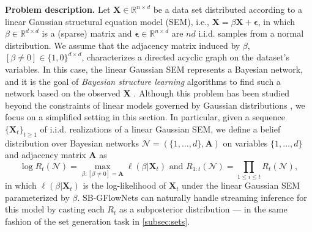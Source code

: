 \documentclass{article}
\newcommand{\pp}[1]{\vspace{0pt}\noindent\textbf{#1}}
\theoremstyle{plain}
\theoremstyle{definition}
\theoremstyle{remark}
\theoremstyle{remark}
\begin{document}
\pp{Problem description.} Let $\mathbf{X} \in \mathbb{R}^{n \times d}$ be a data set distributed according to a linear Gaussian structural equation model (SEM), i.e., $\mathbf{X} = \beta \mathbf{X} + \boldsymbol{\epsilon}$, in which $\beta \in \mathbb{R}^{d \times d}$ is a (sparse) matrix and $\boldsymbol{\epsilon} \in \mathbb{R}^{n \times d}$ are $nd$ i.i.d. samples from a normal distribution. We assume that the adjacency matrix induced by $\beta$, $[\beta \neq 0] \in \{1, 0\}^{d \times d}$, characterizes a directed acyclic graph on the dataset's variables. In this case, the linear Gaussian SEM represents a Bayesian network, and it is the goal of \emph{Bayesian structure learning} algorithms to find such a network based on the observed $\mathbf{X}$ \cite{deleu2022bayesian}. Although this problem has been studied beyond the constraints of linear models governed by Gaussian distributions \cite{deleu2023joint}, we focus on a simplified setting in this section. In particular, given a sequence $\{\mathbf{X}_{t}\}_{t \ge 1}$ of i.i.d. realizations of a linear Gaussian SEM, we define a belief distribution over Bayesian networks $\mathcal{N} = (\{1, \dots, d\}, \mathbf{A})$ on variables $\{1, \dots, d\}$ and adjacency matrix $\mathbf{A}$ as  
\begin{equation}
    \log R_{t}(\mathcal{N}) = \max_{\beta \colon [\beta \neq 0] = \mathbf{A}} \ell \left( \beta | \mathbf{X}_{t} \right) \text{ and } R_{1:t}(\mathcal{N}) = \prod_{1 \le i \le t} R_{t}(\mathcal{N}), %
\end{equation}
in which $\ell(\beta | \mathbf{X}_{t})$ is the log-likelihood of $\mathbf{X}_{t}$ under the linear Gaussian SEM parameterized by $\beta$. 
SB-GFlowNets can naturally handle streaming inference for this model by casting each $R_{t}$ as a subposterior distribution --- in the same fashion of the set generation task in \autoref{subsec:sets}.  

\end{document}
